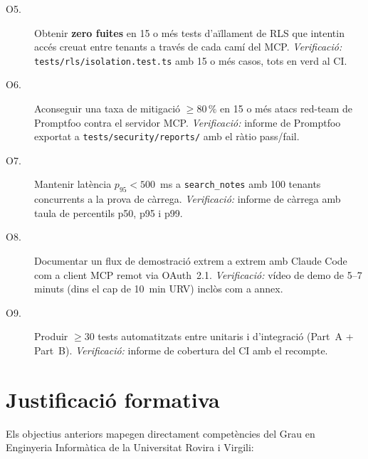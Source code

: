 \begin{sloppypar}
\begin{description}
  \item[O5.] Obtenir \textbf{zero fuites} en 15 o més tests d'aïllament
    de RLS que intentin accés creuat entre tenants a través de cada
    camí del MCP.
    \emph{Verificació:} \texttt{tests/rls/isolation.test.ts} amb
    15 o més casos, tots en verd al CI.

  \item[O6.] Aconseguir una taxa de mitigació $\geq 80\,\%$ en 15 o més
    atacs red-team de Promptfoo contra el servidor MCP.
    \emph{Verificació:} informe de Promptfoo exportat a
    \texttt{tests/security/reports/} amb el ràtio pass/fail.

  \item[O7.] Mantenir latència $p_{95} < 500$~ms a \texttt{search\_notes}
    amb 100 tenants concurrents a la prova de càrrega.
    \emph{Verificació:} informe de càrrega amb taula de percentils p50,
    p95 i p99.

  \item[O8.] Documentar un flux de demostració extrem a extrem amb
    Claude Code com a client MCP remot via OAuth~2.1.
    \emph{Verificació:} vídeo de demo de 5--7 minuts (dins el cap de 10~min URV) inclòs com a annex.

  \item[O9.] Produir $\geq 30$ tests automatitzats entre unitaris i
    d'integració (Part~A + Part~B).
    \emph{Verificació:} informe de cobertura del CI amb el recompte.
\end{description}
\end{sloppypar}

\section{Justificació formativa}
\label{sec:justificacio-formativa}

Els objectius anteriors mapegen directament competències del Grau en
Enginyeria Informàtica de la Universitat Rovira i Virgili:

